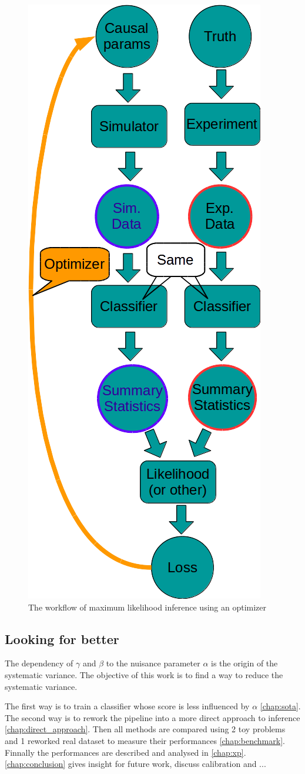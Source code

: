 \begin{figure}[htb]
    \centering
    \includegraphics[width=0.5\linewidth]{workflow}
    \caption{The workflow of maximum likelihood inference using an optimizer}
    \label{fig:workflow}
\end{figure}





\subsection{Looking for better} %
\label{sub:looking_for_better}



The dependency of $\gamma$ and $\beta$ to the nuisance parameter $\alpha$ is the origin of the systematic variance.
The objective of this work is to find a way to reduce the systematic variance.

The first way is to train a classifier whose score is less influenced by $\alpha$ \autoref{chap:sota}.
The second way is to rework the pipeline into a more direct approach to inference \autoref{chap:direct_approach}.
Then all methods are compared using 2 toy problems and 1 reworked real dataset to measure their performances \autoref{chap:benchmark}.
Finnally the performances are described and analysed in \autoref{chap:xp}.
\autoref{chap:conclusion} gives insight for future work, discuss calibration and ...


